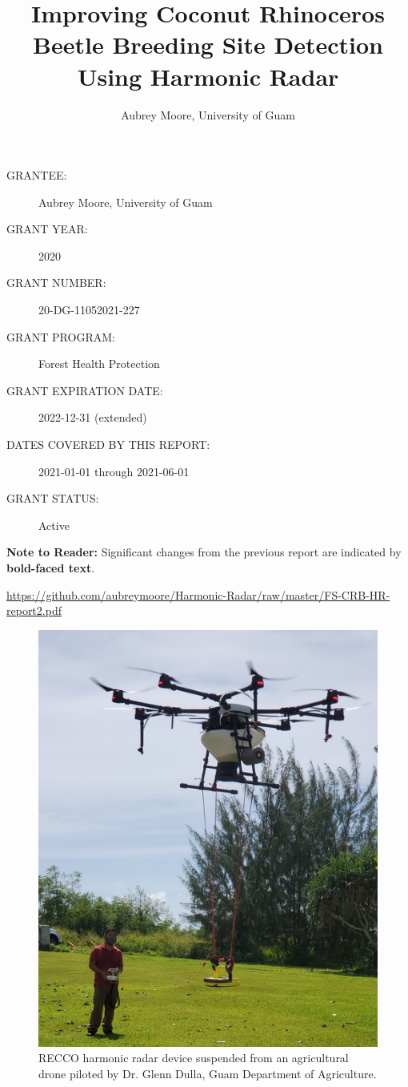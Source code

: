 \documentclass[12pt,letterpaper,english,bibliography=totocnumbered,abstract=on]{scrartcl}
\begin{document}
\titlehead{US Forest Service Forest Health Protetion Grant Progess Report 2}
\title{Improving Coconut Rhinoceros Beetle Breeding Site Detection Using Harmonic Radar}
\author{Aubrey Moore, University of Guam}
\maketitle
\begin{description}	
	\item[GRANTEE:] Aubrey Moore, University of Guam 
	\item[GRANT YEAR:] 2020
	\item[GRANT NUMBER:] 20-DG-11052021-227
	\item[GRANT PROGRAM:] Forest Health Protection
	\item[GRANT EXPIRATION DATE:] 2022-12-31 (extended)
	\item[DATES COVERED BY THIS REPORT:] 2021-01-01 through 2021-06-01
	\item[GRANT STATUS:] Active
\end{description}	

\textbf{Note to Reader:} Significant changes from the previous report are indicated by \textbf{bold-faced text}.

\bigskip

\begin{footnotesize}
\url{https://github.com/aubreymoore/Harmonic-Radar/raw/master/FS-CRB-HR-report2.pdf}
\end{footnotesize}


\newpage{}
\tableofcontents{}

\newpage

\begin{figure}
	\centering
	\includegraphics[width=0.7\linewidth]{drone}
	\caption{RECCO harmonic radar device suspended from an agricultural drone piloted by Dr. Glenn Dulla, Guam Department of Agriculture.}
	\label{fig:drone}
\end{figure}
\end{document}

